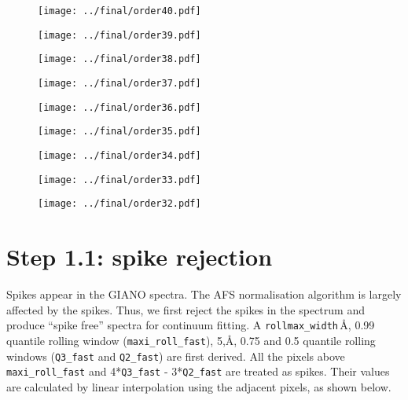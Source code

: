 \documentclass{article}
\begin{document}
\begin{figure}[H]
    \centering
    \texttt{[image: ../final/order40.pdf]}
\end{figure}
\begin{figure}[H]
    \centering
    \texttt{[image: ../final/order39.pdf]}
\end{figure}
\begin{figure}[H]
    \centering
    \texttt{[image: ../final/order38.pdf]}
\end{figure}
\begin{figure}[H]
    \centering
    \texttt{[image: ../final/order37.pdf]}
\end{figure}
\begin{figure}[H]
    \centering
    \texttt{[image: ../final/order36.pdf]}
\end{figure}
\begin{figure}[H]
    \centering
    \texttt{[image: ../final/order35.pdf]}
\end{figure}
\begin{figure}[H]
    \centering
    \texttt{[image: ../final/order34.pdf]}
\end{figure}
\begin{figure}[H]
    \centering
    \texttt{[image: ../final/order33.pdf]}
\end{figure}
\begin{figure}[H]
    \centering
    \texttt{[image: ../final/order32.pdf]}
\end{figure}

\newpage

\section{Step 1.1: spike rejection}

Spikes appear in the GIANO spectra.
The AFS normalisation algorithm is largely affected by the spikes. 
Thus, we first reject the spikes in the spectrum and produce ``spike free'' spectra for continuum fitting.
A \texttt{rollmax\_width}\,\r{A}, 0.99 quantile rolling window (\texttt{maxi\_roll\_fast}), 5,\r{A}, 0.75 and 0.5 quantile rolling windows (\texttt{Q3\_fast} and \texttt{Q2\_fast}) are  first derived. 
All the pixels above \texttt{maxi\_roll\_fast} and 4*\texttt{Q3\_fast} - 3*\texttt{Q2\_fast} are treated as spikes. 
Their values are calculated by linear interpolation using the adjacent pixels, as shown below.
\end{document}
